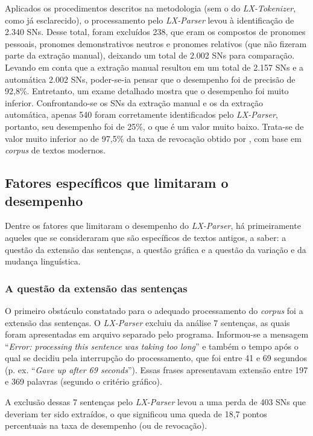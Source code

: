 \documentclass[portuguese]{textolivre}
\begin{document}
Aplicados os procedimentos descritos na metodologia (sem o do \textit{LX-Tokenizer}, como já esclarecido), o processamento pelo \textit{LX-Parser} levou à identificação de 2.340 SNs. Desse total, foram excluídos 238, que eram os compostos de pronomes pessoais, pronomes demonstrativos neutros e pronomes relativos (que não fizeram parte da extração manual), deixando um total de 2.002 SNs para comparação. Levando em conta que a extração manual resultou em um total de 2.157 SNs e a automática 2.002 SNs, poder-se-ia pensar que o desempenho foi de precisão de 92,8\%. Entretanto, um exame detalhado mostra que o desempenho foi muito inferior. Confrontando-se os SNs da extração manual e os da extração automática, apenas 540 foram corretamente identificados pelo \textit{LX-Parser}, portanto, seu desempenho foi de 25\%, o que é um valor muito baixo. Trata-se de valor muito inferior ao de 97,5\% da taxa de revocação obtido por \textcite[p.~170]{silva_indexacao_2014}, com base em \textit{corpus} de textos modernos.

\subsection{Fatores específicos que limitaram o desempenho}

Dentre os fatores que limitaram o desempenho do \textit{LX-Parser}, há primeiramente aqueles que se consideraram que são específicos de textos antigos, a saber: a questão da extensão das sentenças, a questão gráfica e a questão da variação e da mudança linguística.

\subsubsection{A questão da extensão das sentenças}

O primeiro obstáculo constatado para o adequado processamento do \textit{corpus} foi a extensão das sentenças. O \textit{LX-Parser} excluiu da análise 7 sentenças, as quais foram apresentadas em arquivo separado pelo programa. Informou-se a mensagem “\textit{Error: processing this sentence was taking too long}” e também o tempo após o qual se decidiu pela interrupção do processamento, que foi entre 41 e 69 segundos (p. ex. “\textit{Gave up after 69 seconds}”). Essas frases apresentavam extensão entre 197 e 369 palavras (segundo o critério gráfico).

A exclusão dessas 7 sentenças pelo \textit{LX-Parser} levou a uma perda de 403 SNs que deveriam ter sido extraídos, o que significou uma queda de 18,7 pontos percentuais na taxa de desempenho (ou de revocação).
\end{document}

